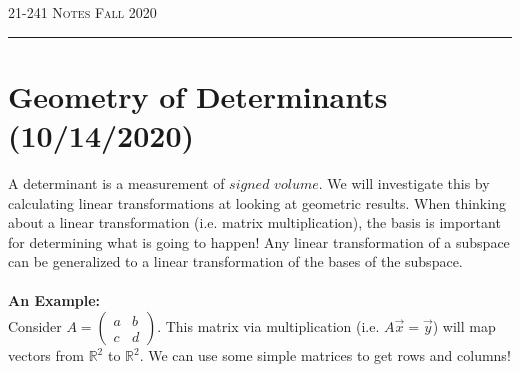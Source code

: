 \documentclass[12pt]{amsart}
\begin{document}
\thispagestyle{empty}

{\scshape 21-241} \hfill {\scshape \Large Notes} \hfill {\scshape Fall 2020}
\medskip
\hrule
\bigskip

\section*{Geometry of Determinants (10/14/2020)}
A determinant is a measurement of $signed$ $volume$. We will investigate this by calculating linear transformations at looking at geometric results. When thinking about a linear transformation (i.e. matrix multiplication), the basis is important for determining what is going to happen! Any linear transformation of a subspace can be generalized to a linear transformation of the bases of the subspace.\\
\\
\textbf{An Example: }\\Consider $A=\begin{pmatrix}a&b\\c&d\end{pmatrix}$. This matrix via multiplication (i.e. $A\vec{x}=\vec{y}$) will map vectors from $\mathbb{R}^2$ to $\mathbb{R}^2$. We can use some simple matrices to get rows and columns!
\end{document}
